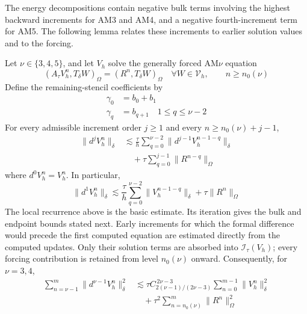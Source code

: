 \documentclass[11pt]{article}
\begin{document}
The energy decompositions contain negative bulk terms involving the highest
backward increments for AM3 and AM4, and a negative fourth-increment term for
AM5. The following lemma relates these increments to earlier solution values
and to the forcing.

\begin{lem}
\label{lem:adams-increment-recurrence}
Let \(\nu\in\{3,4,5\}\), and let \(V_h\) solve the generally forced AM\(\nu\)
equation
\begin{equation}
(A_{\tau}V_h^n,T_{\delta}W)_{\Omega}
=(R^n,T_{\delta}W)_{\Omega}
\quad\forall W\in\mathcal V_h,\qquad n\ge n_0(\nu)
\label{eq:am-general-forced-equation}
\end{equation}
Define
the remaining-stencil coefficients by
\begin{align}
\gamma_0&=b_0+b_1 \label{eq:adams-recurrence-first-coefficient}\\
\gamma_q&=b_{q+1}\quad 1\le q\le \nu-2 \label{eq:adams-recurrence-remaining-coefficients}
\end{align}
For every admissible increment order \(j\ge1\) and every
\(n\ge n_0(\nu)+j-1\),
\begin{align}
\|d^jV_h^n\|_{\delta}
&\lesssim\frac{\tau}{h}
\sum_{q=0}^{\nu-2}\|d^{j-1}V_h^{n-1-q}\|_{\delta} \label{eq:adams-increment-recurrence-solution}\\
&\quad+\tau\sum_{q=0}^{j-1}
\|R^{n-q}\|_{\Omega} \label{eq:adams-increment-recurrence-forcing}
\end{align}
where \(d^0V_h^n=V_h^n\). In particular,
\begin{equation}
\|d^1V_h^n\|_{\delta}
\lesssim\frac{\tau}{h}\sum_{q=0}^{\nu-2}\|V_h^{n-1-q}\|_{\delta}
+\tau\|R^n\|_{\Omega} \label{eq:d1ubound}
\end{equation}
The local recurrence above is the basic estimate. Its iteration gives the
bulk and endpoint bounds stated next.
Early increments for which the formal difference would precede the first
computed equation are estimated directly from the computed updates. Only
their solution terms are absorbed into \(\mathcal I_{\tau}(V_h)\); every
forcing contribution is retained from level \(n_0(\nu)\) onward. Consequently,
for \(\nu=3,4\),
\begin{align}
\sum_{n=\nu-1}^{m}\|d^{\nu-1}V_h^n\|_{\delta}^2
&\lesssim\tau C_{2(\nu-1)/(2\nu-3)}^{\,2\nu-3}
\sum_{n=0}^{m-1}\|V_h^n\|_{\delta}^2 \label{eq:adams-high-increment-bulk-solution}\\
&\quad+\tau^2\sum_{n=n_0(\nu)}^{m}\|R^n\|_{\Omega}^2

\end{align}
\end{lem}
\end{document}
